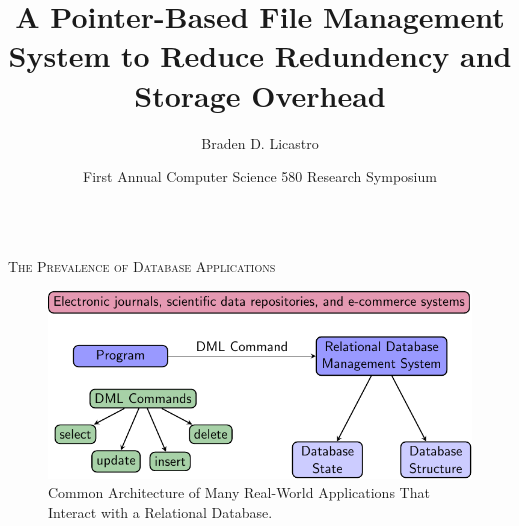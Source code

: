\documentclass[final,t]{beamer}
\title{A Pointer-Based File Management System to Reduce Redundency and Storage Overhead}
\author[Licastro]{Braden D. Licastro}
\institute{Department of Computer Science, Allegheny College}
\date[CSRS 2013] {First Annual Computer Science 580 Research Symposium}
\begin{document}
  \begin{frame}{}  
  \vspace*{-6mm}
  	\begin{columns}[t]

%
%
      \begin{column}{.325\linewidth}

	    
	    
			

        \begin{block}{\textsc{The Prevalence of Database Applications}}
  
          \begin{figure}			
  	    \centering
            \includegraphics[width=.95\linewidth]{evolution_database_applications_wrapper_crop}
            \vspace*{.05in}
	    \caption{Common Architecture of Many Real-World
              Applications That Interact with a Relational Database.}
            

\end{figure}
\end{block}
\end{column}
\end{columns}
\end{frame}
\end{document}

